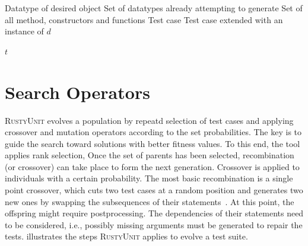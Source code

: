 \documentclass[paper=a4,%
  twoside,%
  BCOR4mm,%
  abstract=true,%
  toc=bibliography,%
  chapterprefix=true,%
  toc=bibliographynumbered,%
  open=right,%
  english,%
  pagesize=pdftex]{scrreprt}
\newcommand{\Desc}[2]{\State \makebox[2em][l]{#1}#2}
\newcommand{\tech}{\textsc{RustyUnit}\xspace}
\begin{document}
\begin{algorithm}[t]
\caption{$GenObject(d, G, M, t)$}
\label{alg:genobject}
\begin{algorithmic}
\Input
  \Desc{$d$}{Datatype of desired object}
  \Desc{$G$}{Set of datatypes already attempting to generate}
  \Desc{$M$}{Set of all method, constructors and functions}
  \Desc{$t$}{Test case}
\EndInput
\Output
  \Desc{$t$}{Test case extended with an instance of $d$}
\EndOutput
{}

  \EndIf
\EndFor
{}
\State \Return $t$
\end{algorithmic}
\end{algorithm}

\section{Search Operators}
\label{sec:search-operators}
\tech evolves a population by repeatd selection of test cases and applying crossover and mutation operators according to the set probabilities. The key is to guide the search toward solutions with better fitness values. To this end, the tool applies rank selection, Once the set of parents has been selected, recombination (or crossover) can take place to form the next generation. Crossover is applied to individuals with a certain probability. The most basic recombination is a single point crossover, which cuts two test cases at a random position and generates two new ones by swapping the subsequences of their statements~\cite{Fraser2012}. At this point, the offspring might require postprocessing. The dependencies of their statements need to be considered, i.e., possibly missing arguments must be generated to repair the tests.  illustrates the steps \tech applies to evolve a test suite.
\end{document}
